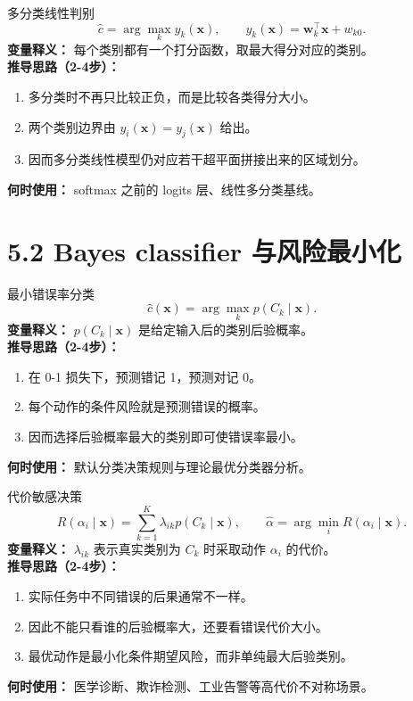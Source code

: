 ﻿\documentclass[11pt]{article}
\begin{document}
\begin{formulabox}{多分类线性判别}
\begin{equation}
\hat c=\arg\max_k y_k(\mathbf x),
\qquad y_k(\mathbf x)=\mathbf w_k^\top\mathbf x+w_{k0}.
\end{equation}
\textbf{变量释义：} 每个类别都有一个打分函数，取最大得分对应的类别。\\
\textbf{推导思路（2-4步）：}
\begin{enumerate}[leftmargin=1.6em]
  \item 多分类时不再只比较正负，而是比较各类得分大小。
  \item 两个类别边界由 $y_i(\mathbf x)=y_j(\mathbf x)$ 给出。
  \item 因而多分类线性模型仍对应若干超平面拼接出来的区域划分。
\end{enumerate}
\textbf{何时使用：} softmax 之前的 logits 层、线性多分类基线。
\end{formulabox}

\section{5.2 Bayes classifier 与风险最小化}
\begin{formulabox}{最小错误率分类}
\begin{equation}
\hat c(\mathbf x)=\arg\max_k p(C_k\mid \mathbf x).
\end{equation}
\textbf{变量释义：} $p(C_k\mid \mathbf x)$ 是给定输入后的类别后验概率。\\
\textbf{推导思路（2-4步）：}
\begin{enumerate}[leftmargin=1.6em]
  \item 在 0-1 损失下，预测错记 1，预测对记 0。
  \item 每个动作的条件风险就是预测错误的概率。
  \item 因而选择后验概率最大的类别即可使错误率最小。
\end{enumerate}
\textbf{何时使用：} 默认分类决策规则与理论最优分类器分析。
\end{formulabox}

\begin{formulabox}{代价敏感决策}
\begin{equation}
R(\alpha_i\mid \mathbf x)=\sum_{k=1}^{K} \lambda_{ik}p(C_k\mid \mathbf x),
\qquad
\hat\alpha=\arg\min_i R(\alpha_i\mid \mathbf x).
\end{equation}
\textbf{变量释义：} $\lambda_{ik}$ 表示真实类别为 $C_k$ 时采取动作 $\alpha_i$ 的代价。\\
\textbf{推导思路（2-4步）：}
\begin{enumerate}[leftmargin=1.6em]
  \item 实际任务中不同错误的后果通常不一样。
  \item 因此不能只看谁的后验概率大，还要看错误代价大小。
  \item 最优动作是最小化条件期望风险，而非单纯最大后验类别。
\end{enumerate}
\textbf{何时使用：} 医学诊断、欺诈检测、工业告警等高代价不对称场景。
\end{formulabox}
\end{document}
